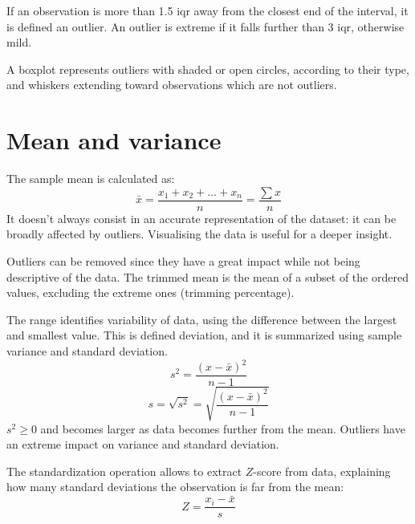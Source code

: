 If an observation is more than 1.5 iqr away from the closest end of the interval, it is defined an outlier. An outlier is extreme if it falls further than 3 iqr, otherwise mild. 

A boxplot represents outliers with shaded or open circles, according to their type, and whiskers extending toward observations which are not outliers.

\section{Mean and variance}
The sample mean is calculated as:
$$\bar{x} = \frac{x_1 + x_2 + \dots + x_n }{n} = \frac{\sum x}{n}$$
It doesn't always consist in an accurate representation of the dataset: it can be broadly affected by outliers. Visualising the data is useful for a deeper insight.

Outliers can be removed since they have a great impact while not being descriptive of the data. The trimmed mean is the mean of a subset of the ordered values, excluding the extreme ones (trimming percentage).

The range identifies variability of data, using the difference between the largest and smallest value. This is defined deviation, and it is summarized using sample variance and standard deviation.
$$s^2 = \frac{(x - \bar{x})^2}{n - 1}$$
$$s = \sqrt{s^2} = \sqrt{\frac{(x - \bar{x})^2}{n - 1}}$$
$s^2 \geq 0$ and becomes larger as data becomes further from the mean. Outliers have an extreme impact on variance and standard deviation.

The standardization operation allows to extract $Z$-score from data, explaining how many standard deviations the observation is far from the mean:
$$Z = \frac{x_i - \bar{x}}{s}$$

